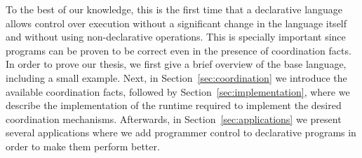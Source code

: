 To the best of our knowledge, this is the first time that a declarative language allows 
control over execution without a significant change in the language itself and
without using non-declarative operations. This is specially important since
programs can be proven to be correct even in the presence of coordination facts.
In order to prove our thesis, we first give a brief overview of the
base language, including a small example. Next, in
Section~\ref{sec:coordination} we introduce the available coordination facts,
followed by Section~\ref{sec:implementation}, where we describe the
implementation of the runtime required to implement the desired coordination
mechanisms. Afterwards, in Section~\ref{sec:applications} we present several applications where we add
programmer control to declarative programs in order to make them perform better.
